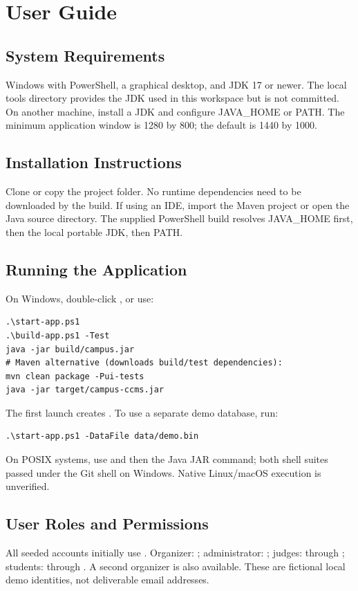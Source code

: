 \clearpage\appendix
\section{User Guide}
\subsection{System Requirements}
Windows with PowerShell, a graphical desktop, and JDK 17 or newer. The local tools directory provides the JDK used in this workspace but is not committed. On another machine, install a JDK and configure JAVA\_HOME or PATH. The minimum application window is 1280 by 800; the default is 1440 by 1000.
\subsection{Installation Instructions}
Clone or copy the project folder. No runtime dependencies need to be downloaded by the build. If using an IDE, import the Maven project or open the Java source directory. The supplied PowerShell build resolves JAVA\_HOME first, then the local portable JDK, then PATH.
\subsection{Running the Application}
On Windows, double-click , or use:
\begin{verbatim}
.\start-app.ps1
.\build-app.ps1 -Test
java -jar build/campus.jar
# Maven alternative (downloads build/test dependencies):
mvn clean package -Pui-tests
java -jar target/campus-ccms.jar
\end{verbatim}
The first launch creates . To use a separate demo database, run:
\begin{verbatim}
.\start-app.ps1 -DataFile data/demo.bin
\end{verbatim}
On POSIX systems, use  and then the Java JAR command; both shell suites passed under the Git shell on Windows. Native Linux/macOS execution is unverified.
\subsection{User Roles and Permissions}
All seeded accounts initially use . Organizer: ; administrator: ; judges:  through ; students:  through . A second organizer is also available. These are fictional local demo identities, not deliverable email addresses.

